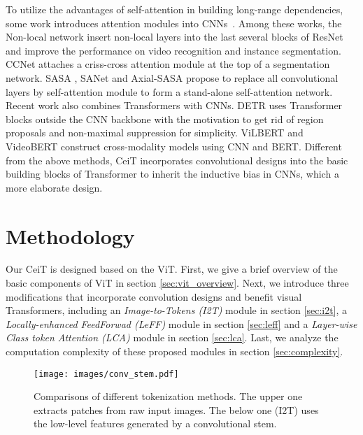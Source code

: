 \documentclass[10pt,twocolumn,letterpaper]{article}
\begin{document}
To utilize the advantages of self-attention in building long-range dependencies, some work introduces attention modules into CNNs~\cite{DBLP:conf/eccv/ZhaoZLSLLJ18,DBLP:conf/cvpr/YangHGDS16,DBLP:conf/cvpr/0004GGH18,DBLP:conf/iccv/BelloZLVS19,DBLP:conf/nips/ChenKLYF18, DBLP:conf/iccv/HuZXL19,DBLP:conf/eccv/WooPLK18}. Among these works, the Non-local network \cite{DBLP:conf/cvpr/0004GGH18} insert non-local layers into the last several blocks of ResNet~\cite{DBLP:conf/cvpr/HeZRS16} and improve the performance on video recognition and instance segmentation. CCNet \cite{DBLP:conf/iccv/HuangWHHW019} attaches a criss-cross attention module at the top of a segmentation network. 
SASA \cite{DBLP:conf/nips/ParmarRVBLS19}, SANet \cite{DBLP:conf/cvpr/ZhaoJK20} and Axial-SASA \cite{DBLP:conf/eccv/WangZGAYC20} propose to replace all convolutional layers by self-attention module to form a stand-alone self-attention network.
Recent work also combines Transformers with CNNs. DETR \cite{DBLP:conf/eccv/CarionMSUKZ20} uses Transformer blocks outside the CNN backbone with the motivation to get rid of region proposals and non-maximal suppression for simplicity. 
ViLBERT \cite{DBLP:conf/nips/LuBPL19} and VideoBERT \cite{DBLP:conf/iccv/SunMV0S19} construct cross-modality models using CNN and BERT. 
Different from the above methods, CeiT incorporates convolutional designs into the basic building blocks of Transformer to inherit the inductive bias in CNNs, which a more elaborate design.

\section{Methodology}\label{sec:method}

Our CeiT is designed based on the ViT. First, we give a brief overview of the basic components of ViT in section \ref{sec:vit_overview}. Next, we introduce three modifications that incorporate convolution designs and benefit visual Transformers, including an \textit{Image-to-Tokens (I2T)} module in section \ref{sec:i2t}, a \textit{Locally-enhanced FeedForwad (LeFF)} module in section \ref{sec:leff} and 
a \textit{Layer-wise Class token Attention (LCA)} module in section \ref{sec:lca}. Last, we analyze the computation complexity of these proposed modules in section \ref{sec:complexity}.

\begin{figure}[t!]
  \centering    
  \texttt{[image: images/conv\_stem.pdf]}
  \caption{Comparisons of different tokenization methods. The upper one extracts patches from raw input images. The below one (I2T) uses the low-level features generated by a convolutional stem.}
  \label{fig:i2t}
\end{figure}
\end{document}
